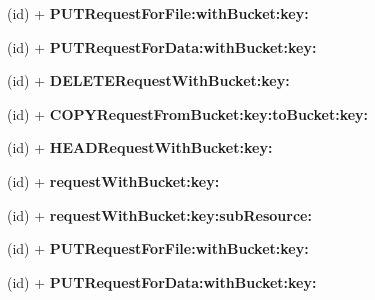 \begin{DoxyCompactItemize}
\item 
\hypertarget{interface_a_s_i_s3_object_request_a07ff4bdb86902d59cb602be9bdc7ac14}{
(id) + {\bfseries \-P\-U\-T\-Request\-For\-File\-:with\-Bucket\-:key\-:}}
\label{interface_a_s_i_s3_object_request_a07ff4bdb86902d59cb602be9bdc7ac14}

\item 
\hypertarget{interface_a_s_i_s3_object_request_a06b5bf032c9b54a0fd0b17e0d1fecad5}{
(id) + {\bfseries \-P\-U\-T\-Request\-For\-Data\-:with\-Bucket\-:key\-:}}
\label{interface_a_s_i_s3_object_request_a06b5bf032c9b54a0fd0b17e0d1fecad5}

\item 
\hypertarget{interface_a_s_i_s3_object_request_a0602fac9aee5730f513b0a49e2be0dd9}{
(id) + {\bfseries \-D\-E\-L\-E\-T\-E\-Request\-With\-Bucket\-:key\-:}}
\label{interface_a_s_i_s3_object_request_a0602fac9aee5730f513b0a49e2be0dd9}

\item 
\hypertarget{interface_a_s_i_s3_object_request_a0048cc08b9cfef9c78abd81faa472d48}{
(id) + {\bfseries \-C\-O\-P\-Y\-Request\-From\-Bucket\-:key\-:to\-Bucket\-:key\-:}}
\label{interface_a_s_i_s3_object_request_a0048cc08b9cfef9c78abd81faa472d48}

\item 
\hypertarget{interface_a_s_i_s3_object_request_a88538201f1def9da2ff385880b78c8ef}{
(id) + {\bfseries \-H\-E\-A\-D\-Request\-With\-Bucket\-:key\-:}}
\label{interface_a_s_i_s3_object_request_a88538201f1def9da2ff385880b78c8ef}

\item 
\hypertarget{interface_a_s_i_s3_object_request_a8fc06d7585b85db69f81678fc1560ab0}{
(id) + {\bfseries request\-With\-Bucket\-:key\-:}}
\label{interface_a_s_i_s3_object_request_a8fc06d7585b85db69f81678fc1560ab0}

\item 
\hypertarget{interface_a_s_i_s3_object_request_aac357e6e8d9eab201a5d97c6e2ad1574}{
(id) + {\bfseries request\-With\-Bucket\-:key\-:sub\-Resource\-:}}
\label{interface_a_s_i_s3_object_request_aac357e6e8d9eab201a5d97c6e2ad1574}

\item 
\hypertarget{interface_a_s_i_s3_object_request_a07ff4bdb86902d59cb602be9bdc7ac14}{
(id) + {\bfseries \-P\-U\-T\-Request\-For\-File\-:with\-Bucket\-:key\-:}}
\label{interface_a_s_i_s3_object_request_a07ff4bdb86902d59cb602be9bdc7ac14}

\item 
\hypertarget{interface_a_s_i_s3_object_request_a06b5bf032c9b54a0fd0b17e0d1fecad5}{
(id) + {\bfseries \-P\-U\-T\-Request\-For\-Data\-:with\-Bucket\-:key\-:}}
\label{interface_a_s_i_s3_object_request_a06b5bf032c9b54a0fd0b17e0d1fecad5}


\end{DoxyCompactItemize}
